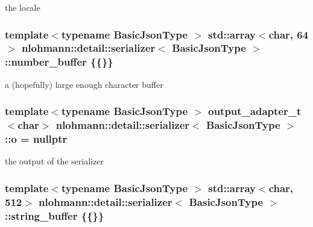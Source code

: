 the locale 

\subsubsection[{\texorpdfstring{number\+\_\+buffer}{number_buffer}}]{\setlength{\rightskip}{0pt plus 5cm}template$<$typename Basic\+Json\+Type $>$ {\bf std\+::array}$<$char, 64$>$ {\bf nlohmann\+::detail\+::serializer}$<$ Basic\+Json\+Type $>$\+::number\+\_\+buffer \{\{\}\}\hspace{0.3cm}{\ttfamily [private]}}\hypertarget{classnlohmann_1_1detail_1_1serializer_a1a9d8b344a6cb47728a3519693ec03d1}{}\label{classnlohmann_1_1detail_1_1serializer_a1a9d8b344a6cb47728a3519693ec03d1}


a (hopefully) large enough character buffer 

\subsubsection[{\texorpdfstring{o}{o}}]{\setlength{\rightskip}{0pt plus 5cm}template$<$typename Basic\+Json\+Type $>$ {\bf output\+\_\+adapter\+\_\+t}$<$char$>$ {\bf nlohmann\+::detail\+::serializer}$<$ Basic\+Json\+Type $>$\+::o = nullptr\hspace{0.3cm}{\ttfamily [private]}}\hypertarget{classnlohmann_1_1detail_1_1serializer_acf3c88660d3cbc65fc71c4d84f2a9f59}{}\label{classnlohmann_1_1detail_1_1serializer_acf3c88660d3cbc65fc71c4d84f2a9f59}


the output of the serializer 

\subsubsection[{\texorpdfstring{string\+\_\+buffer}{string_buffer}}]{\setlength{\rightskip}{0pt plus 5cm}template$<$typename Basic\+Json\+Type $>$ {\bf std\+::array}$<$char, 512$>$ {\bf nlohmann\+::detail\+::serializer}$<$ Basic\+Json\+Type $>$\+::string\+\_\+buffer \{\{\}\}\hspace{0.3cm}{\ttfamily [private]}}\hypertarget{classnlohmann_1_1detail_1_1serializer_a9c9b7ca63a66e59e5e7ffe8a2acf5c8f}{}\label{classnlohmann_1_1detail_1_1serializer_a9c9b7ca63a66e59e5e7ffe8a2acf5c8f}


